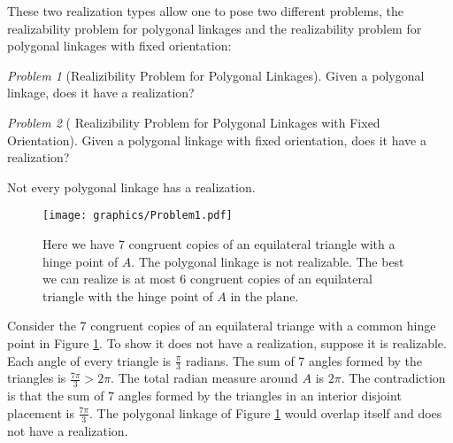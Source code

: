 \documentclass[10pt]{CSUNthesis}
\theoremstyle{plain}%
\theoremstyle{definition}
\theoremstyle{remark}
\newtheorem{prob}{Problem}
\begin{document}
These two realization types allow one to pose two different problems, the realizability problem for polygonal linkages and the realizability problem for polygonal linkages with fixed orientation:
\begin{prob}[Realizibility Problem for Polygonal Linkages]\label{problem:UnorderedPolygonal}
Given a polygonal linkage, does it have a realization?
\end{prob}
\begin{prob}[ Realizibility Problem for Polygonal Linkages with Fixed Orientation]\label{problem:OrderedPolygonal}
Given a polygonal linkage with fixed orientation, does it have a realization?
\end{prob}
Not every polygonal linkage has a realization.
\begin{figure}[!htbp]
\begin{center}
\texttt{[image: graphics/Problem1.pdf]}
\end{center} 
\caption{Here we have 7 congruent copies of an equilateral triangle with a hinge point of $A$.  The polygonal linkage is not realizable.  The best we can realize is at most 6 congruent copies of an equilateral triangle with the hinge point of $A$ in the plane.}
\label{fig:problem1}
\end{figure}
Consider the 7 congruent copies of an equilateral triange with a common hinge point in Figure \ref{fig:problem1}.
To show it does not have a realization, suppose it is realizable.  
Each angle of every triangle is $\frac{\pi}{3}$ radians.  
The sum of 7 angles formed by the triangles is $\frac{7\pi}{3}>2\pi$.  
The total radian measure around $A$ is $2 \pi$.
The contradiction is that the sum of 7 angles formed by the triangles in an interior disjoint placement is $\frac{7\pi}{3}$.
The polygonal linkage of Figure \ref{fig:problem1} would overlap itself and does not have a realization.
\end{document}
